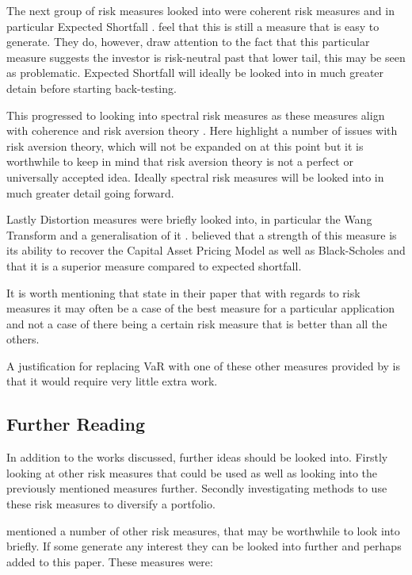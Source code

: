 \documentclass[12pt,a4paper]{article}
\begin{document}
The next group of risk measures looked into were coherent risk measures and in particular Expected Shortfall \citep{ACERBI20021505}. \cite{dowd2006after} feel that this is still a measure that is easy to generate. They do, however, draw attention to the fact that this particular measure suggests the investor is risk-neutral past that lower tail, this may be seen as problematic. Expected Shortfall will ideally be looked into in much greater detain before starting back-testing.

This progressed to looking into spectral risk measures as these measures align with coherence and risk aversion theory \citep{dowd2006after}. Here \cite{dowd2006after} highlight a number of issues with risk aversion theory, which will not be expanded on at this point but it is worthwhile to keep in mind that risk aversion theory is not a perfect or universally accepted idea. Ideally spectral risk measures will be looked into in much greater detail going forward.

Lastly Distortion measures were briefly looked into, in particular the Wang Transform and a generalisation of it  \citep{dowd2006after}. \cite{dowd2006after} believed that a strength of this measure is its ability to recover the Capital Asset Pricing Model as well as Black-Scholes and that it is a superior measure compared to expected shortfall.
 
It is worth mentioning that \cite{dowd2006after} state in their paper that with regards to risk measures it may often be a case of the best measure for a particular application and not a case of there being a certain risk measure that is better than all the others. 

A justification for replacing VaR with one of these other measures provided by \cite{dowd2006after} is that it would require very little extra work. 

\subsection{Further Reading}
\label{subsec:FurRead}

In addition to the works discussed, further ideas should be looked into. Firstly looking at other risk measures that could be used as well as looking into the previously mentioned measures further. Secondly investigating methods to use these risk measures to diversify a portfolio. 

\cite{dowd2006after} mentioned a number of other risk measures, that may be worthwhile to look into briefly. If some generate any interest they can be looked into further and perhaps added to this paper. These measures were:
\end{document}
